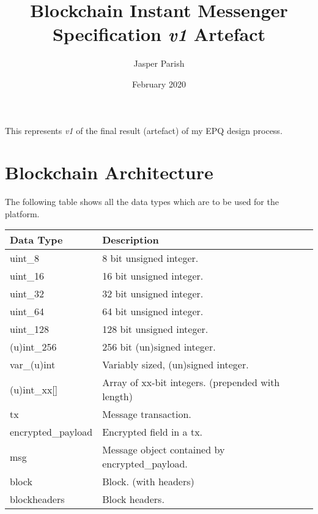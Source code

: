 \documentclass{article}
\title{Blockchain Instant Messenger Specification \textit{v1} Artefact}
\author{Jasper Parish}
\date{February 2020}
\begin{document}
\maketitle
\begin{center}
   This represents \textit{v1} of the final result (artefact) of my EPQ design process.
\end{center}

\newpage
\tableofcontents
\newpage


\section{Blockchain Architecture}
The following table shows all the data types which are to be used for the platform.
\begin{table}[h]
\centering
\begin{tabular}{|l|p{8.5cm}|}
\hline
\rowcolor{tblgrey} 
Data Type  & Description                \\ \hline
uint\_8     & 8 bit unsigned integer.            \\ \hline
uint\_16    & 16 bit unsigned integer.           \\ \hline
uint\_32    & 32 bit unsigned integer.           \\ \hline
uint\_64    & 64 bit unsigned integer.           \\ \hline
uint\_128   & 128 bit unsigned integer.          \\ \hline
(u)int\_256 & 256 bit (un)signed integer.          \\ \hline
var\_(u)int & Variably sized, (un)signed integer.    \\ \hline
(u)int\_xx[\hspace{0.05cm}] & Array of xx-bit integers. (prepended with length) \\ \hline
tx          & Message transaction.      \\ \hline
encrypted\_payload & Encrypted field in a tx. \\ \hline
msg         & Message object contained by encrypted\_payload. \\ \hline
block       & Block. (with headers)     \\ \hline
blockheaders& Block headers.            \\ \hline
\end{tabular}
\end{table}
\end{document}
